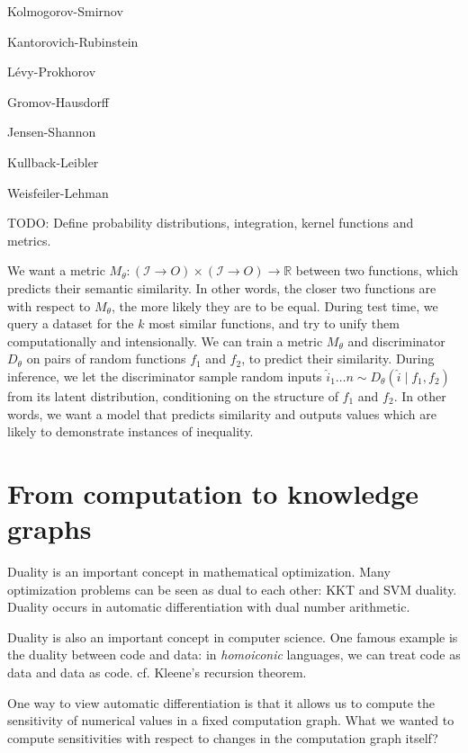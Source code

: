 \documentclass[11pt]{article}
\begin{document}
    Kolmogorov-Smirnov

    Kantorovich-Rubinstein

    L\'evy-Prokhorov

    Gromov-Hausdorff

    Jensen-Shannon

    Kullback-Leibler

    Weisfeiler-Lehman

    TODO: Define probability distributions, integration, kernel functions and metrics.

    We want a metric $M_\theta: (\mathcal{I}\rightarrow{O}) \times (\mathcal{I}\rightarrow{O})\rightarrow \mathbb{R}$ between two functions, which predicts their semantic similarity. In other words, the closer two functions are with respect to $M_\theta$, the more likely they are to be equal. During test time, we query a dataset for the $k$ most similar functions, and try to unify them computationally and intensionally. We can train a metric $M_\theta$ and discriminator $D_\theta$ on pairs of random functions $f_1$ and $f_2$, to predict their similarity. During inference, we let the discriminator sample random inputs $\hat i_1 \ldots n \sim D_\theta(\hat i \mid f_1, f_2)$ from its latent distribution, conditioning on the structure of $f_1$ and $f_2$. In other words, we want a model that predicts similarity and outputs values which are likely to demonstrate instances of inequality.

    \pagebreak


    \section{From computation to knowledge graphs}\label{sec:graphs}


    Duality is an important concept in mathematical optimization. Many optimization problems can be seen as dual to each other: KKT and SVM duality. Duality occurs in automatic differentiation with dual number arithmetic.

    Duality is also an important concept in computer science. One famous example is the duality between code and data: in \textit{homoiconic} languages, we can treat code as data and data as code. cf. Kleene's recursion theorem.

    One way to view automatic differentiation is that it allows us to compute the sensitivity of numerical values in a fixed computation graph. What we wanted to compute sensitivities with respect to changes in the computation graph itself?
\end{document}
